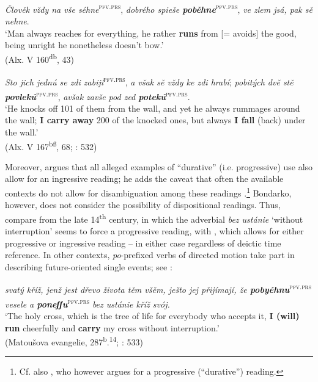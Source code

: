 \documentclass[output=paper,colorlinks,citecolor=brown]{langscibook}
\begin{document}
\ea \label{ex:wiemer:29}
    \textit{Člověk vždy na vše séhne}\textsuperscript{\textsc{pfv.prs}}, \textit{dobrého spieše \textbf{poběhne}}\textsuperscript{\textsc{pfv.prs}}, \textit{ve zlem jsá, pak sě nehne}.\\
    ‘Man always reaches for everything, he rather \textbf{runs} from [= avoids] the good, being unright he nonetheless doesn’t bow.’\\
    \hfill (Alx. V 160\textsuperscript{db}, 43)
\z

\ea \label{ex:wiemer:30}
    \textit{Sto jich jednú se zdi zabijí}\textsuperscript{\textsc{pfv.prs}}, \textit{a však sě vždy ke zdi hrabí}; \textit{pobitých dvě stě \textbf{povlekú}}\textsuperscript{\textsc{pfv.prs}}, \textit{avšak zavše pod zed \textbf{potekú}}\textsuperscript{\textsc{pfv.prs}}.\\
    ‘He knocks off 101 of them from the wall, and yet he always rummages around the wall; \textbf{I carry away} 200 of the knocked ones, but always \textbf{I fall} (back) under the wall.’\\
    \hfill (Alx. V 167\textsuperscript{bß}, 68; \citealt{Bondarko1961}: 532) 
\z


Moreover, \citet[533]{Bondarko1961} argues that all alleged examples of “durative” (i.e. progressive) use also allow for an ingressive reading; he adds the caveat that often the available contexts do not allow for disambiguation among these readings \citep[534]{Bondarko1961}.\footnote{Cf. also \citet[274--275]{Němec2009b}, who however argues for a progressive (“durative”) reading.} Bondarko, however, does not consider the possibility of dispositional readings. Thus, compare  from the late 14\textsuperscript{th} century, in which the adverbial \textit{bez ustánie} ‘without interruption’ seems to force a progressive reading, with , which allows for either progressive or ingressive reading – in either case regardless of deictic time reference. In other contexts, \textit{po}-prefixed verbs of directed motion take part in describing future-oriented single events; see :

\ea \label{ex:wiemer:31} 
    \textit{svatý kříž, jenž jest dřevo života těm všěm, ješto jej přijímají, že \textbf{pobyéhnu}}\textsuperscript{\textsc{pfv.prs}} \textit{vesele a \textbf{poneʃʃu}}\textsuperscript{\textsc{pfv.prs}} \textit{bez ustánie kříž svój.}\\
    ‘The holy cross, which is the tree of life for everybody who accepts it, \textbf{I (will) run} cheerfully and \textbf{carry} my cross without interruption.’\\
    \hfill (Matoušova evangelie, 287\textsuperscript{b}.\textsuperscript{14}; \citealt{Bondarko1961}: 533)
\z
\end{document}
